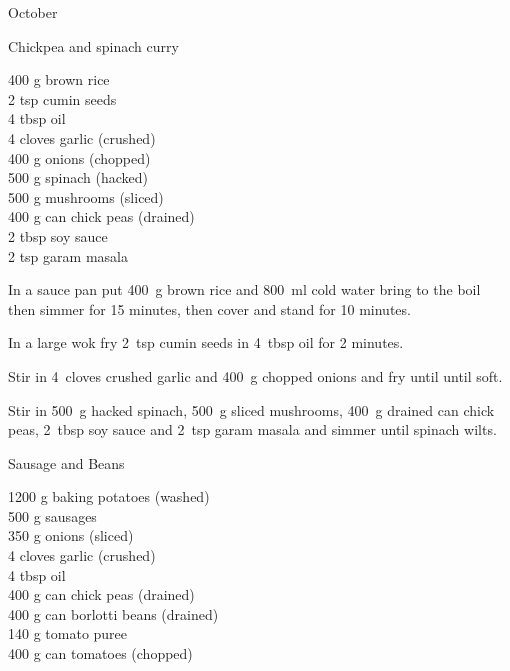 \begin{menu}{October}
\begin{recipe}{2}{Chickpea and spinach curry}
		\begin{ingredients}
		400 g brown rice  \\
	2 tsp cumin seeds  \\
	4 tbsp oil  \\
	4 cloves garlic (crushed) \\
	400 g onions (chopped) \\
	500 g spinach (hacked) \\
	500 g mushrooms (sliced) \\
	400 g can chick peas (drained) \\
	2 tbsp soy sauce  \\
	2 tsp garam masala  \\
	
		\end{ingredients}
	
	
    \begin{instructions}
    \item 
      In a
      sauce pan
      put
      400~g  brown rice
      and
      800~ml  cold water
      bring to the boil then simmer for 15 minutes,
      then cover and stand for 10 minutes.
    \item 
        In a large wok fry
        2~tsp  cumin seeds
        in
        4~tbsp  oil
        for 2 minutes.
      \item 
        Stir in
        4~cloves crushed garlic
        and
        400~g chopped onions
        and fry until until soft.
      \item 
        Stir in
        500~g hacked spinach,
        500~g sliced mushrooms,
        400~g drained can chick peas,
        2~tbsp  soy sauce
        and
        2~tsp  garam masala
        and simmer until spinach wilts.
      
    \end{instructions}
    \end{recipe}%
  
    \begin{recipe}{2}{Sausage and Beans}%
    
		\begin{ingredients}
		1200 g baking potatoes (washed) \\
	500 g sausages  \\
	350 g onions (sliced) \\
	4 cloves garlic (crushed) \\
	4 tbsp oil  \\
	400 g can chick peas (drained) \\
	400 g can borlotti beans (drained) \\
	140 g tomato puree  \\
	400 g can tomatoes (chopped) \\
	

\end{ingredients}
\end{recipe}
\end{menu}

